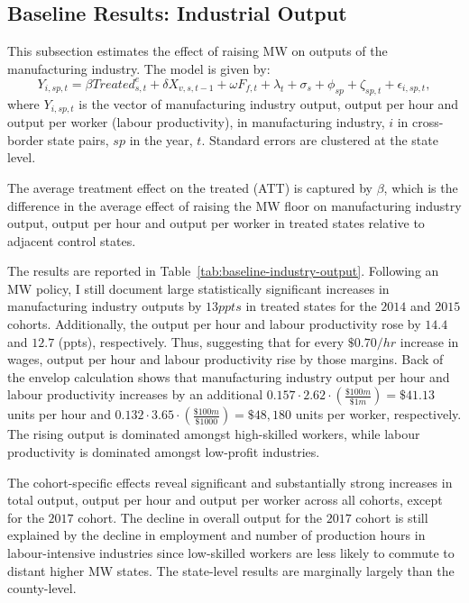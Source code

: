 \documentclass[numsec,webpdf,contemporary,large,namedate]{oup-authoring-template}%
\begin{document}
    \subsection{Baseline Results: Industrial Output}\label{subsec:baseline-results-industrial-output}
    This subsection estimates the effect of raising MW on outputs of the manufacturing industry. The model is given by:
    \begin{equation}
        Y_{i,sp,t} = \beta Treated_{s,t}^e + \delta X_{v,s,t-1} + \omega F_{f,t} + \lambda_{t} + \sigma_{s} + \phi_{sp} + \zeta_{sp,t} + \epsilon_{i,sp,t},\label{eq:baseline-output}
    \end{equation}
    where $Y_{i,sp,t}$ is the vector of manufacturing industry output, output per hour and output per worker (labour productivity), in manufacturing industry, $i$ in cross-border state pairs, $sp$ in the year, $t$. Standard errors are clustered at the state level.
    

    The average treatment effect on the treated (ATT) is captured by $\beta$, which is the difference in the average effect of raising the MW floor on manufacturing industry output, output per hour and output per worker in treated states relative to adjacent control states.

    The results are reported in Table~\ref{tab:baseline-industry-output}. Following an MW policy, I still document large statistically significant increases in manufacturing industry outputs by $13ppts$ in treated states for the $2014$ and $2015$ cohorts. Additionally, the output per hour and labour productivity rose by $14.4$ and $12.7$ (ppts), respectively. Thus, suggesting that for every $\$0.70/hr$ increase in wages, output per hour and labour productivity rise by those margins. Back of the envelop calculation shows that manufacturing industry output per hour and labour productivity increases by an additional $0.157 \cdot 2.62 \cdot \left(\frac{\$100m}{\$1m}\right) = \$41.13$ units per hour and $0.132 \cdot 3.65 \cdot \left(\frac{\$100m}{\$1000}\right) = \$48,180$ units per worker, respectively. The rising output is dominated amongst high-skilled workers, while labour productivity is dominated amongst low-profit industries.

    The cohort-specific effects reveal significant and substantially strong increases in total output, output per hour and output per worker across all cohorts, except for the $2017$ cohort. The decline in overall output for the $2017$ cohort is still explained by the decline in employment and number of production hours in labour-intensive industries since low-skilled workers are less likely to commute to distant higher MW states. The state-level results are marginally largely than the county-level.
\end{document}
